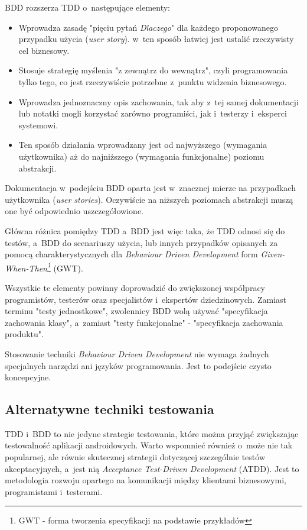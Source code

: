 BDD rozszerza TDD o~następujące elementy:
\begin{itemize}
\item
Wprowadza zasadę "pięciu pytań \textit{Dlaczego}" dla każdego proponowanego przypadku użycia (\textit{user story}). w~ten sposób łatwiej jest ustalić rzeczywisty cel biznesowy.

\item
Stosuje strategię myślenia "z zewnątrz do wewnątrz", czyli programowania tylko tego, co jest rzeczywiście potrzebne z~punktu widzenia biznesowego.

\item
Wprowadza jednoznaczny opis zachowania, tak aby z~tej samej dokumentacji lub notatki mogli korzystać zarówno programiści, jak i~testerzy i~eksperci systemowi.

\item
Ten sposób działania wprowadzany jest od najwyższego (wymagania użytkownika) aż do najniższego (wymagania funkcjonalne) poziomu abstrakcji.

\end{itemize}

Dokumentacja w~podejściu BDD oparta jest w~znacznej mierze na przypadkach użytkownika (\textit{user stories}). Oczywiście na niższych poziomach abstrakcji muszą one być odpowiednio uszczegółowione.

Główna różnica pomiędzy TDD a~BDD jest więc taka, że TDD odnosi się do testów, a~BDD do scenariuszy użycia, lub innych przypadków opisanych za pomocą charakterystycznych dla \textit{Behaviour Driven Development} form \textit{Given-When-Then\footnote{GWT - forma tworzenia specyfikacji na podstawie przykładów}} (GWT).

Wszystkie te elementy powinny doprowadzić do zwiększonej współpracy programistów, testerów oraz specjalistów i~ekspertów dziedzinowych. Zamiast terminu "testy jednostkowe", zwolennicy BDD wolą używać "specyfikacja zachowania klasy", a~zamiast "testy funkcjonalne" - "specyfikacja zachowania produktu".

Stosowanie techniki \textit{Behaviour Driven Development} nie wymaga żadnych specjalnych narzędzi ani języków programowania. Jest to podejście czysto koncepcyjne.\cite{website:agile:guide}

\subsection{Alternatywne techniki testowania}
\label{alternatywne_metody_testowania}
TDD i~BDD to nie jedyne strategie testowania, które można przyjąć zwiększając testowalność aplikacji androidowych. Warto wspomnieć również o~może nie tak popularnej, ale równie skutecznej strategii dotyczącej szczególnie testów akceptacyjnych, a~jest nią \textit{Acceptance Test-Driven Development} (ATDD). Jest to metodologia rozwoju opartego na komunikacji między klientami biznesowymi, programistami i~testerami. 

